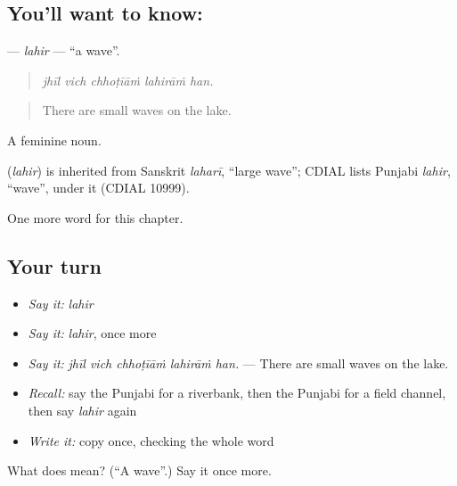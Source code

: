 \subsection*{You'll want to know: }
\textbf{} — \emph{lahir} — \textquotedblleft{}a wave\textquotedblright{}.

\begin{quote}
    
\end{quote}

\begin{quote}
\emph{jhīl vich chhoṭīāṁ lahirāṁ han.}
\end{quote}

\begin{quote}
There are small waves on the lake.
\end{quote}

A feminine noun.

\begin{cousinweb}
\textbf{} (\emph{lahir}) is inherited from Sanskrit \emph{laharī}, \textquotedblleft{}large wave\textquotedblright{}; CDIAL lists Punjabi \emph{lahir}, \textquotedblleft{}wave\textquotedblright{}, under it (CDIAL 10999).
\end{cousinweb}

\begin{grammarlens}[title={What you've built}]
One more word for this chapter.
\end{grammarlens}

\subsection*{Your turn}
\begin{itemize}
\raggedright
  \item \emph{Say it:} \emph{lahir}
  \item \emph{Say it:} \emph{lahir}, once more
  \item \emph{Say it:} \emph{jhīl vich chhoṭīāṁ lahirāṁ han.} — There are small waves on the lake.
  \item \emph{Recall:} say the Punjabi for a riverbank, then the Punjabi for a field channel, then say \emph{lahir} again
  \item \emph{Write it:} copy \textbf{} once, checking the whole word
\end{itemize}

\begin{tcolorbox}[breakable,colback=teal!4,colframe=teal!35!black,title={Before you move on}]
What does  mean? (\textquotedblleft{}A wave\textquotedblright{}.) Say it once more.
\end{tcolorbox}
